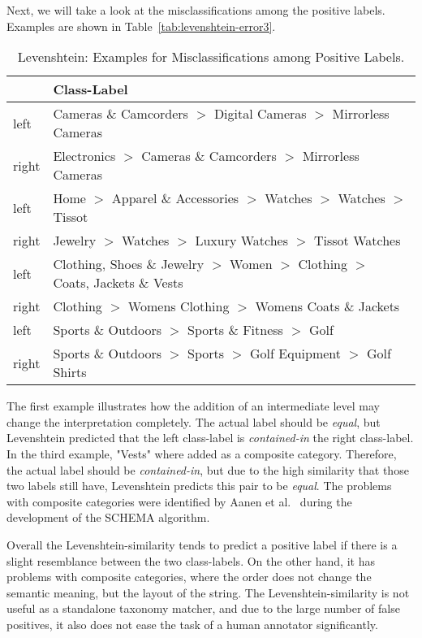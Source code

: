 Next, we will take a look at the misclassifications among the positive labels.
Examples are shown in Table~\ref{tab:levenshtein-error3}.
\begin{table}[htbp]
    \begin{center}
        \begin{tabularx}{\textwidth}{lX}
            & Class-Label \\
            \hline
            left & Cameras \& Camcorders $>$ Digital Cameras $>$ Mirrorless Cameras \\
            right & Electronics $>$ Cameras \& Camcorders $>$ Mirrorless Cameras \\
            \hline
            left & Home $>$ Apparel \& Accessories $>$ Watches $>$ Watches $>$ Tissot \\
            right & Jewelry $>$ Watches $>$ Luxury Watches $>$ Tissot Watches \\
            \hline
            left & Clothing, Shoes \& Jewelry $>$ Women $>$ Clothing $>$ Coats, Jackets \& Vests \\
            right & Clothing $>$ Womens Clothing $>$ Womens Coats \& Jackets \\
            \hline
            left & Sports \& Outdoors $>$ Sports \& Fitness $>$ Golf \\
            right & Sports \& Outdoors $>$ Sports $>$ Golf Equipment $>$ Golf Shirts \\
        \end{tabularx}
        \caption{Levenshtein: Examples for Misclassifications among Positive Labels.}
        \label{tab:levenshtein-error4}
    \end{center}
\end{table}
The first example illustrates how the addition of an intermediate level may change the interpretation completely.
The actual label should be \emph{equal}, but Levenshtein predicted that the left class-label is \emph{contained-in} the right class-label.
In the third example, "Vests" where added as a composite category.
Therefore, the actual label should be \emph{contained-in}, but due to the high similarity that those two labels still have,
Levenshtein predicts this pair to  be \emph{equal}.
The problems with composite categories were identified by Aanen et al.\@~\cite{aanen2012schema} during the development
of the SCHEMA algorithm.

Overall the Levenshtein-similarity tends to predict a positive label if there is a slight resemblance between the two
class-labels.
On the other hand, it has problems with composite categories, where the order does not change the semantic meaning,
but the layout of the string.
The Levenshtein-similarity is not useful as a standalone taxonomy matcher, and due to the large number of false positives,
it also does not ease the task of a human annotator significantly.

